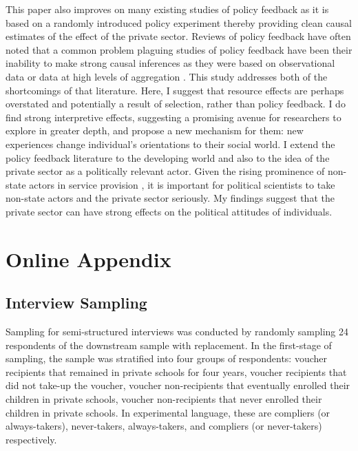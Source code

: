 \documentclass[hidelinks, 12pt, titlepage]{article}
\begin{document}
	This paper also improves on many existing studies of policy feedback as it is based on a randomly introduced policy experiment thereby providing clean causal estimates of the effect of the private sector.  Reviews of policy feedback have often noted that a common problem plaguing studies of policy feedback have been their inability to make strong causal inferences as they were based on observational data or data at high levels of aggregation \citep{Campbell2012}.  This study addresses both of the shortcomings of that literature.  Here, I suggest that resource effects are perhaps overstated and potentially a result of selection, rather than policy feedback.  I do find strong interpretive effects, suggesting a promising avenue for researchers to explore in greater depth, and propose a new mechanism for them: new experiences change individual's orientations to their social world.  I extend the policy feedback literature to the developing world and also to the idea of the private sector as a politically relevant actor.  Given the rising prominence of non-state actors in service provision \citep{Cammett2011}, it is important for political scientists to take non-state actors and the private sector seriously.  My findings suggest that the private sector can have strong effects on the political attitudes of individuals.

\clearpage

\singlespacing



\clearpage
{}%
\renewcommand*{\thepage}{\thesection\arabic{page}}
\renewcommand\thefigure{\thesection\arabic{figure}}
\renewcommand\thetable{\thesection\arabic{table}}
\setcounter{figure}{0}
\setcounter{table}{0}

\appendix

\doublespacing

\section{Online Appendix}

	\subsection{Interview Sampling\label{appendix:interviews}}

		Sampling for semi-structured interviews was conducted by randomly sampling 24 respondents of the downstream sample with replacement.  In the first-stage of sampling, the sample was stratified into four groups of respondents: voucher recipients that remained in private schools for four years, voucher recipients that did not take-up the voucher, voucher non-recipients that eventually enrolled their children in private schools, voucher non-recipients that never enrolled their children in private schools.  In experimental language, these are compliers (or always-takers), never-takers, always-takers, and compliers (or never-takers) respectively.
\end{document}
